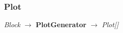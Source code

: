 \subsubsection{Plot}
\begin{center}
    \textit{Block} $\rightarrow$ \textbf{PlotGenerator} $\rightarrow$ \textit{Plot{[}{]}}
\end{center}